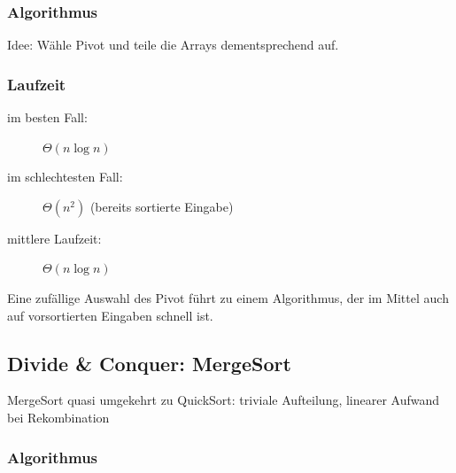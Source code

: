\documentclass{scrartcl}
\begin{document}
\subsubsection{Algorithmus}
Idee: Wähle Pivot und teile die Arrays dementsprechend auf.
\subsubsection{Laufzeit}
\begin{description}
	\item[im besten Fall:] $\Theta(n\log n)$
	\item[im schlechtesten Fall:] $\Theta(n^2)$ {\tiny (bereits sortierte Eingabe)}
	\item[mittlere Laufzeit:] $\Theta(n\log n)$
\end{description}
Eine zufällige Auswahl des Pivot führt zu einem Algorithmus, der im Mittel auch auf vorsortierten Eingaben schnell ist.

\subsection{Divide \& Conquer: MergeSort}
MergeSort quasi umgekehrt zu QuickSort: triviale Aufteilung, linearer Aufwand bei Rekombination
\subsubsection{Algorithmus}
\end{document}
